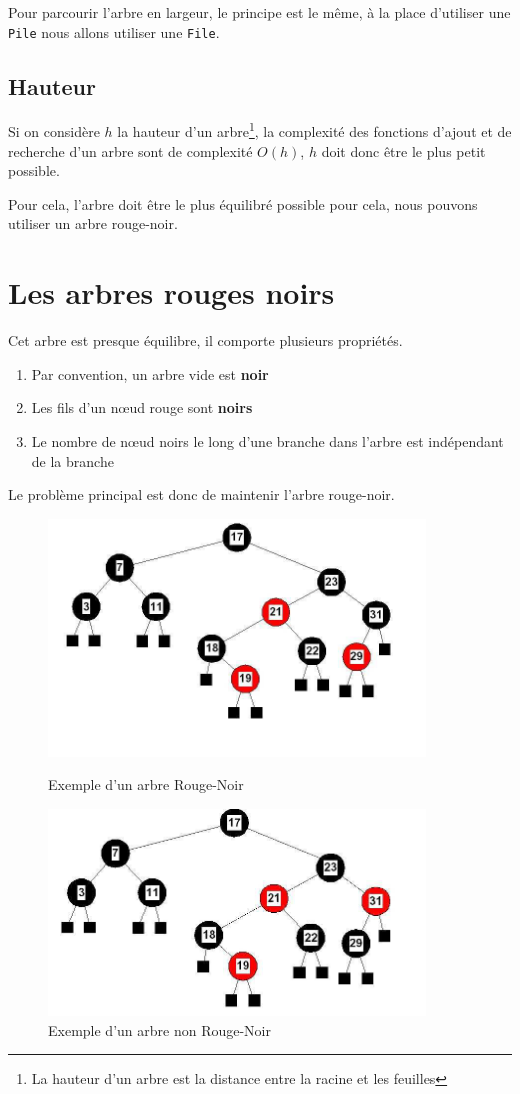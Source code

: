 Pour parcourir l'arbre en largeur, le principe est le même, à la place d'utiliser une \texttt{Pile} nous allons utiliser une \texttt{File}.


\subsection{Hauteur}
Si on considère $h$ la hauteur d'un arbre\footnote{La hauteur d'un arbre est la distance entre la racine et les feuilles}, la complexité des fonctions d'ajout et de recherche d'un arbre sont de complexité $O(h)$, $h$ doit donc être le plus petit possible.  

Pour cela, l'arbre doit être le plus équilibré possible pour cela, nous pouvons utiliser un arbre rouge-noir.

\section{Les arbres rouges noirs}
Cet arbre est presque équilibre, il comporte plusieurs propriétés.
\begin{enumerate}
	\item Par convention, un arbre vide est \textbf{noir}
	\item Les fils d'un nœud rouge sont \textbf{noirs}
	\item Le nombre de nœud noirs le long d'une branche dans l'arbre est indépendant de la branche 
\end{enumerate}

Le problème principal est donc de maintenir l'arbre rouge-noir.

\begin{figure}[H]
	\centering
	\includegraphics[width=10cm]{content/schemas/arbreRN.png}
	\caption{Exemple d'un arbre Rouge-Noir}
	\includegraphics[width=10cm]{content/schemas/arbreNonRN.png}
	\caption{Exemple d'un arbre non Rouge-Noir}
\end{figure}
